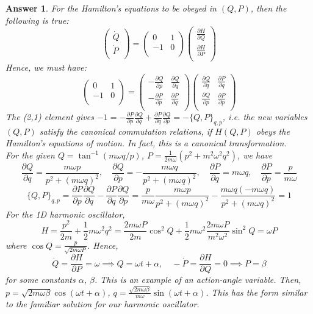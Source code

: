 \documentclass[a4paper]{article}
\newtheorem{ans}{Answer}[section]
\theoremstyle{new}
\begin{document}
\begin{ans}
For the Hamilton's equations to be obeyed in $(Q,P)$, then the following is true:
$$\begin{pmatrix}\dot{Q}\\\dot{P}\\\end{pmatrix}=\begin{pmatrix}0&1\\-1&0\\\end{pmatrix}\begin{pmatrix}\frac{\partial H}{\partial Q}\\\frac{\partial H}{\partial P}\\\end{pmatrix}$$
Hence, we must have:
$$\begin{pmatrix}0&1\\-1&0\\\end{pmatrix}=\begin{pmatrix}-\frac{\partial Q}{\partial p}&\frac{\partial Q}{\partial q}\\-\frac{\partial P}{\partial p}&\frac{\partial P}{\partial q}\\\end{pmatrix}\begin{pmatrix}\frac{\partial Q}{\partial q}&\frac{\partial P}{\partial q}\\\frac{\partial Q}{\partial p}&\frac{\partial P}{\partial p}\\\end{pmatrix}$$
The (2,1) element gives $-1=-\frac{\partial P}{\partial p}\frac{\partial Q}{\partial q}+\frac{\partial P}{\partial q}\frac{\partial Q}{\partial p}=-\{Q,P\}_{q,p}$, i.e. the new variables $(Q,P)$ satisfy the canonical commutation relations, if $H(Q,P)$ obeys the Hamilton's equations of motion. In fact, this is a canonical transformation.\\[5pt]
For the given $Q=\tan^{-1}(m\omega q/p)$, $P=\frac{1}{2m\omega}(p^2+m^2\omega^2q^2)$, we have
$$\frac{\partial Q}{\partial q}=\frac{m\omega p}{p^2+(m\omega q)^2},\quad\frac{\partial Q}{\partial p}=-\frac{m\omega q}{p^2+(m\omega q)^2},\quad\frac{\partial P}{\partial q}=m\omega q,\quad\frac{\partial P}{\partial p}=\frac{p}{m\omega}$$
$$\{Q,P\}_{q,p}=\frac{\partial P}{\partial p}\frac{\partial Q}{\partial q}-\frac{\partial P}{\partial q}\frac{\partial Q}{\partial p}=\frac{p}{m\omega}\frac{m\omega p}{p^2+(m\omega q)^2}-\frac{m\omega q(-m\omega q)}{p^2+(m\omega q)^2}=1$$
For the 1D harmonic oscillator,
$$H=\frac{p^2}{2m}+\frac{1}{2}m\omega^2q^2=\frac{2m\omega P}{2m}\cos^2Q+\frac{1}{2}m\omega^2\frac{2m\omega P}{m^2\omega^2}\sin^2Q=\omega P$$
where $\cos Q=\frac{p}{\sqrt{2m\omega P}}$. Hence,
$$\dot{Q}=\frac{\partial H}{\partial P}=\omega\implies Q=\omega t+\alpha,\quad-\dot{P}=\frac{\partial H}{\partial Q}=0\implies P=\beta$$
for some constants $\alpha$, $\beta$. This is an example of an action-angle variable. Then, $p=\sqrt{2m\omega\beta}\cos(\omega t+\alpha)$, $q=\frac{\sqrt{2m\omega\beta}}{m\omega}\sin(\omega t+\alpha)$. This has the form similar to the familiar solution for our harmonic oscillator.
\end{ans}
\end{document}
